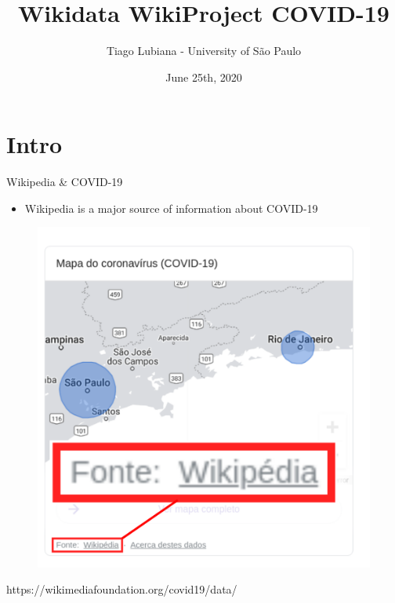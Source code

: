 \documentclass{beamer}
\title[Wikidata WikiProject COVID-19]{Wikidata WikiProject COVID-19}
\author[User:TiagoLubiana]{Tiago Lubiana - University of São Paulo}
\date[25/06/2020]{June 25th, 2020}
\begin{document}
{

}



\begin{frame}
  \titlepage
\end{frame}



\section{Intro}

\begin{frame}{Wikipedia \& COVID-19}

\begin{itemize}
    \item Wikipedia is a major source of information about COVID-19

\end{itemize}

\begin{figure}
\includegraphics[scale=0.45]{fig/wikipedia_in_google.png}
\end{figure}

 https://wikimediafoundation.org/covid19/data/
 
\end{frame}
\end{document}
